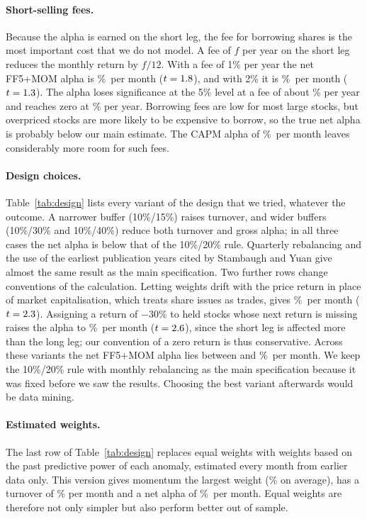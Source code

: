 \documentclass[12pt,a4paper]{article}
\newcommand{\pmo}{\%~per month}
\begin{document}
\paragraph{Short-selling fees.} Because the alpha is earned on the short leg, the fee for borrowing shares is the most important cost that we do not model. A fee of $f$ per year on the short leg reduces the monthly return by $f/12$. With a fee of 1\% per year the net FF5+MOM alpha is \feeone\pmo{} ($t=1.8$), and with 2\% it is \feetwo\pmo{} ($t=1.3$). The alpha loses significance at the 5\% level at a fee of about \feesig\% per year and reaches zero at \feebe\% per year. Borrowing fees are low for most large stocks, but overpriced stocks are more likely to be expensive to borrow, so the true net alpha is probably below our main estimate. The CAPM alpha of \netfullcapm\pmo{} leaves considerably more room for such fees.

\paragraph{Design choices.} Table~\ref{tab:design} lists every variant of the design that we tried, whatever the outcome. A narrower buffer (10\%/15\%) raises turnover, and wider buffers (10\%/30\% and 10\%/40\%) reduce both turnover and gross alpha; in all three cases the net alpha is below that of the 10\%/20\% rule. Quarterly rebalancing and the use of the earliest publication years cited by Stambaugh and Yuan give almost the same result as the main specification. Two further rows change conventions of the calculation. Letting weights drift with the price return in place of market capitalisation, which treats share issues as trades, gives \driftnet\pmo{} ($t=2.3$). Assigning a return of $-30\%$ to held stocks whose next return is missing raises the alpha to \missnet\pmo{} ($t=2.6$), since the short leg is affected more than the long leg; our convention of a zero return is thus conservative. Across these variants the net FF5+MOM alpha lies between \designmin{} and \designmax\pmo. We keep the 10\%/20\% rule with monthly rebalancing as the main specification because it was fixed before we saw the results. Choosing the best variant afterwards would be data mining.

\paragraph{Estimated weights.} The last row of Table~\ref{tab:design} replaces equal weights with weights based on the past predictive power of each anomaly, estimated every month from earlier data only. This version gives momentum the largest weight (\combmom\% on average), has a turnover of \combturn\% per month and a net alpha of \combnet\pmo. Equal weights are therefore not only simpler but also perform better out of sample.
\end{document}
